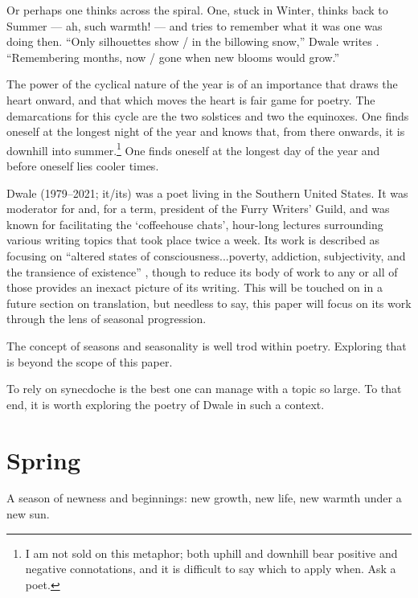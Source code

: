 \documentclass[12pt]{memoir}
\begin{document}
Or perhaps one thinks across the spiral. One, stuck in Winter, thinks back to Summer --- ah, such warmth! --- and tries to remember what it was one was doing then. ``Only silhouettes show / in the billowing snow,'' Dwale writes \parencite[19]{leaves}. ``Remembering months, now / gone when new blooms would grow.''

The power of the cyclical nature of the year is of an importance that draws the heart onward, and that which moves the heart is fair game for poetry. The demarcations for this cycle are the two solstices and two the equinoxes. One finds oneself at the longest night of the year and knows that, from there onwards, it is downhill into summer.\footnote{I am not sold on this metaphor; both uphill and downhill bear positive and negative connotations, and it is difficult to say which to apply when. Ask a poet.} One finds oneself at the longest day of the year and before oneself lies cooler times.

Dwale (1979--2021; it/its) was a poet living in the Southern United States. It was moderator for and, for a term, president of the Furry Writers' Guild, and was known for facilitating the `coffeehouse chats', hour-long lectures surrounding various writing topics that took place twice a week. Its work is described as focusing on ``altered states of consciousness...poverty, addiction, subjectivity, and the transience of existence'' \parencite{dwale}, though to reduce its body of work to any or all of those provides an inexact picture of its writing. This will be touched on in a future section on translation, but needless to say, this paper will focus on its work through the lens of seasonal progression. 

The concept of seasons and seasonality is well trod within poetry. Exploring that is beyond the scope of this paper.
\begin{comment}
\footnote{Or perhaps my abilities as a writer}
\end{comment}
To rely on synecdoche is the best one can manage with a topic so large. To that end, it is worth exploring the poetry of Dwale in such a context.

\clearpage

\section*{Spring}

A season of newness and beginnings: new growth, new life, new warmth under a new sun.
\end{document}
